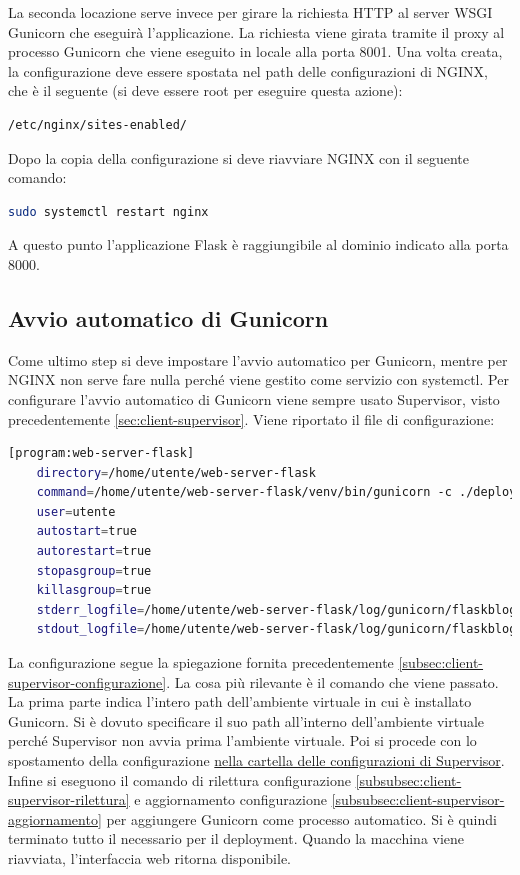 La seconda locazione serve invece per girare la richiesta HTTP al server WSGI Gunicorn 
che eseguirà l'applicazione.
La richiesta viene girata tramite il proxy al processo Gunicorn che viene eseguito in locale alla porta 8001.\newline
Una volta creata, la configurazione deve essere spostata nel path delle configurazioni di NGINX, che è il seguente 
(si deve essere root per eseguire questa azione):
\begin{lstlisting}[language=textnonum]
    /etc/nginx/sites-enabled/
\end{lstlisting}
Dopo la copia della configurazione si deve riavviare NGINX con il seguente comando:
\begin{lstlisting}[language=bash]
    sudo systemctl restart nginx
\end{lstlisting}
A questo punto l'applicazione Flask è raggiungibile al dominio indicato alla porta 8000.

\subsection{Avvio automatico di Gunicorn}
\label{secsub:flask-produzione-automatico}
Come ultimo step si deve impostare l'avvio automatico per Gunicorn, 
mentre per NGINX non serve fare nulla perché viene gestito come servizio con systemctl.
Per configurare l'avvio automatico di Gunicorn viene sempre usato Supervisor, visto precedentemente \ref{sec:client-supervisor}.
Viene riportato il file di configurazione:
\begin{lstlisting}[language=bash]
    [program:web-server-flask]
	directory=/home/utente/web-server-flask
	command=/home/utente/web-server-flask/venv/bin/gunicorn -c ./deploy/gunicorn-config.py run_flask:app
	user=utente
	autostart=true
	autorestart=true
	stopasgroup=true
	killasgroup=true
	stderr_logfile=/home/utente/web-server-flask/log/gunicorn/flaskblog.err.log
	stdout_logfile=/home/utente/web-server-flask/log/gunicorn/flaskblog.out.log
\end{lstlisting}
La configurazione segue la spiegazione fornita precedentemente \ref{subsec:client-supervisor-configurazione}.
La cosa più rilevante è il comando che viene passato.
La prima parte indica l'intero path dell'ambiente virtuale in cui è installato Gunicorn. 
Si è dovuto specificare il suo path all'interno dell'ambiente virtuale perché Supervisor non avvia prima l'ambiente virtuale.\newline
Poi si procede con lo spostamento della configurazione \hyperlink{lst:client-supervisor-path}{nella cartella delle configurazioni di Supervisor}.
Infine si eseguono il comando di rilettura configurazione \ref{subsubsec:client-supervisor-rilettura} 
e aggiornamento configurazione \ref{subsubsec:client-supervisor-aggiornamento} per aggiungere
Gunicorn come processo automatico.\newline
Si è quindi terminato tutto il necessario per il deployment. 
Quando la macchina viene riavviata, l'interfaccia web ritorna disponibile. 
